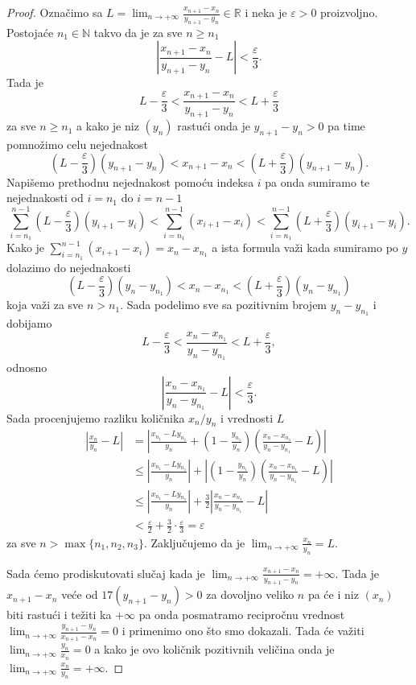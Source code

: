 \documentclass[a4paper,12pt]{article}
\theoremstyle{plain}
\theoremstyle{definition}
\theoremstyle{remark}
\begin{document}
\begin{proof}
Označimo sa $L = \lim_{n \to +\infty} \frac{x_{n+1}-x_n}{y_{n+1}-y_n} \in \mathbb{R}$ i neka je $\varepsilon > 0$ proizvoljno. Postojaće $n_1 \in \mathbb{N}$ takvo da je za sve $n \geq n_1$
$$ \left| \frac{x_{n+1}-x_n}{y_{n+1}-y_n} - L \right| < \frac{\varepsilon}{3}. $$
Tada je
$$ L - \frac{\varepsilon}{3} < \frac{x_{n+1}-x_n}{y_{n+1}-y_n} < L + \frac{\varepsilon}{3} $$
za sve $n \geq n_1$ a kako je niz $(y_n)$ rastući onda je $y_{n+1} - y_n > 0$ pa time pomnožimo celu nejednakost
$$ \left(L - \frac{\varepsilon}{3}\right) (y_{n+1} - y_n) < x_{n+1} - x_n < \left(L + \frac{\varepsilon}{3}\right) (y_{n+1} - y_n). $$
Napišemo prethodnu nejednakost pomoću indeksa $i$ pa onda sumiramo te nejednakosti od $i = n_1$ do $i = n - 1$
$$ \sum_{i=n_1}^{n-1} \left(L - \frac{\varepsilon}{3}\right) (y_{i+1} - y_i) < \sum_{i=n_1}^{n-1} (x_{i+1} - x_i) < \sum_{i=n_1}^{n-1} \left(L + \frac{\varepsilon}{3}\right) (y_{i+1} - y_i). $$
Kako je $\sum_{i=n_1}^{n-1} (x_{i+1} - x_i) = x_n - x_{n_1}$ a ista formula važi kada sumiramo po $y$ dolazimo do nejednakosti
$$ \left(L - \frac{\varepsilon}{3}\right) (y_n - y_{n_1}) < x_n - x_{n_1} < \left(L + \frac{\varepsilon}{3}\right) (y_n - y_{n_1}) $$
koja važi za sve $n > n_1$. Sada podelimo sve sa pozitivnim brojem $y_n - y_{n_1}$ i dobijamo
$$ L - \frac{\varepsilon}{3} < \frac{x_n - x_{n_1}}{y_n - y_{n_1}} < L + \frac{\varepsilon}{3}, $$
odnosno
$$ \left| \frac{x_n - x_{n_1}}{y_n - y_{n_1}} - L \right| < \frac{\varepsilon}{3}. $$
Sada procenjujemo razliku količnika $x_n/y_n$ i vrednosti $L$
\begin{align*}
\left| \frac{x_n}{y_n} - L \right| &= \left| \frac{x_{n_1} - L y_{n_1}}{y_n} + \left(1 - \frac{y_{n_1}}{y_n}\right) \left( \frac{x_n - x_{n_1}}{y_n - y_{n_1}} - L \right) \right| \\
&\leq \left| \frac{x_{n_1} - L y_{n_1}}{y_n} \right| + \left| \left(1 - \frac{y_{n_1}}{y_n}\right) \left( \frac{x_n - x_{n_1}}{y_n - y_{n_1}} - L \right) \right| \\
&\leq \left| \frac{x_{n_1} - L y_{n_1}}{y_n} \right| + \frac{3}{2} \left| \frac{x_n - x_{n_1}}{y_n - y_{n_1}} - L \right| \\
&< \frac{\varepsilon}{2} + \frac{3}{2} \cdot \frac{\varepsilon}{3} = \varepsilon
\end{align*}
za sve $n > \max\{n_1, n_2, n_3\}$. Zaključujemo da je $\lim_{n \to +\infty} \frac{x_n}{y_n} = L$.

Sada ćemo prodiskutovati slučaj kada je $\lim_{n \to +\infty} \frac{x_{n+1}-x_n}{y_{n+1}-y_n} = +\infty$. Tada je $x_{n+1} - x_n$ veće od $17(y_{n+1}-y_n) > 0$ za dovoljno veliko $n$ pa će i niz $(x_n)$ biti rastući i težiti ka $+\infty$ pa onda posmatramo recipročnu vrednost $\lim_{n \to +\infty} \frac{y_{n+1}-y_n}{x_{n+1}-x_n} = 0$ i primenimo ono što smo dokazali. Tada će važiti $\lim_{n \to +\infty} \frac{y_n}{x_n} = 0$ a kako je ovo količnik pozitivnih veličina onda je $\lim_{n \to +\infty} \frac{x_n}{y_n} = +\infty$.


\end{proof}
\end{document}
